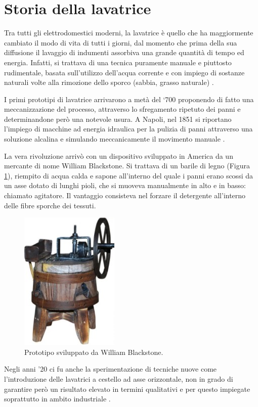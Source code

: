 \section{Storia della lavatrice}
Tra tutti gli elettrodomestici moderni, la lavatrice è quello che ha maggiormente cambiato il modo di vita di tutti i giorni, dal momento che prima della sua diffusione il lavaggio di indumenti assorbiva una grande quantità di tempo ed energia. Infatti, si trattava di una tecnica puramente manuale e piuttosto rudimentale, basata sull’utilizzo dell’acqua corrente e con impiego di sostanze naturali volte alla rimozione dello sporco (sabbia, grasso naturale) \cite{de2002industrie}.


I primi prototipi di lavatrice arrivarono a metà del ‘700 proponendo di fatto una meccanizzazione del processo, attraverso lo sfregamento ripetuto dei panni e determinandone però una notevole usura.
A Napoli, nel 1851 si riportano l’impiego di macchine ad energia idraulica per la pulizia di panni attraverso una soluzione alcalina e simulando meccanicamente il movimento manuale 
\cite{de2002industrie}.


La vera rivoluzione arrivò con un dispositivo sviluppato in America da un mercante di nome William Blackstone. Si trattava di un barile di legno (Figura \ref{Figura 1}), riempito di acqua calda e sapone all’interno del quale i panni erano scossi da un asse dotato di lunghi pioli, che si muoveva manualmente in alto e in basso: chiamato agitatore. Il vantaggio consisteva nel forzare il detergente all’interno delle fibre sporche dei tessuti.


\begin{figure}[h!]
    \centering
    \includegraphics[scale=0.4]{Senza titolo.jpg}
    \caption{Prototipo sviluppato da William Blackstone.}
    \label{Figura 1}
\end{figure}

Negli anni ’20 ci fu anche la sperimentazione di tecniche nuove come l’introduzione delle lavatrici a cestello ad asse orizzontale, non in grado di garantire però un risultato elevato in termini qualitativi e per questo impiegate soprattutto in ambito industriale \cite{asquer2007rivoluzione}.

